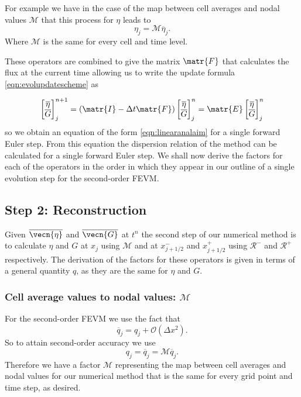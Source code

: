 For example we have in the case of the map between cell averages and nodal values $\mathcal{M}$ that this process for $\eta$ leads to
\[\eta_j = \mathcal{M} \overline{\eta}_j.\]
Where $\mathcal{M}$ is the same for every cell and time level.

These operators are combined to give the matrix $\matr{F}$ that calculates the flux at the current time allowing us to write the update formula \eqref{eqn:evolupdatescheme} as

\begin{equation*}
\begin{bmatrix}
\overline{\eta} \\ \overline{G}
\end{bmatrix}^{n+1}_j = \left(\matr{I}  - \Delta t \matr{F} \right) \begin{bmatrix}
\overline{\eta} \\ \overline{G}
\end{bmatrix}^{n}_j = \matr{E} \begin{bmatrix}
\overline{\eta} \\ \overline{G}
\end{bmatrix}^{n}_j
\end{equation*}
so we obtain an equation of the form \eqref{eqn:linearanalaim} for a single forward Euler step. From this equation the dispersion relation of the method can be calculated for a single forward Euler step. We shall now derive the factors for each of the operators in the order in which they appear in our outline of a single evolution step for the second-order FEVM.

\subsection{Step 2: Reconstruction}
Given $\overline{\vecn{\eta}}$ and $\overline{\vecn{G}}$ at $t^n$ the second step of our numerical method is to calculate $\eta$ and $G$ at $x_j$ using $\mathcal{M}$ and at $x^-_{j+1/2}$ and $x^+_{j+1/2}$ using $\mathcal{R}^-$ and $\mathcal{R}^+$ respectively. The derivation of the factors for these operators is given in terms of a general quantity $q$, as they are the same for $\eta$ and $G$.
\subsubsection{Cell average values to nodal values: $\mathcal{M}$}
For the second-order FEVM we use the fact that
\begin{equation*}
\overline{q}_j =q_j  + \mathcal{O}\left(\Delta x^2\right).
\end{equation*}
%
So to attain second-order accuracy we use
%
\begin{equation}
\label{eqn:Mfactorfourier}
q_j = \overline{q}_j  = \mathcal{M} \overline{q}_j.
\end{equation}
Therefore we have a factor $\mathcal{M}$ representing the map between cell averages and nodal values for our numerical method that is the same for every grid point and time step, as desired.

